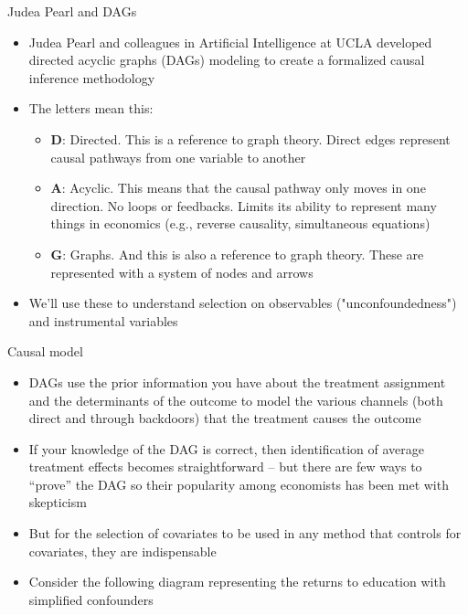 \documentclass{beamer}
\begin{document}
\begin{frame}{Judea Pearl and DAGs}


  \begin{itemize}
    \item Judea Pearl and colleagues in Artificial Intelligence at UCLA developed directed acyclic graphs (DAGs) modeling to create a formalized causal inference methodology
    \item The letters mean this:
    	\begin{itemize}
	\item \textbf{D}: Directed.  This is a reference to graph theory.  Direct edges represent causal pathways from one variable to another
	\item \textbf{A}: Acyclic.  This means that the causal pathway only moves in one direction.  No loops or feedbacks. Limits its ability to represent many things in economics (e.g., reverse causality, simultaneous equations)
	\item \textbf{G}: Graphs. And this is also a reference to graph theory.  These are represented with a system of nodes and arrows
	\end{itemize}
    \item We'll use these to understand selection on observables ("unconfoundedness") and instrumental variables
  \end{itemize}

\end{frame}






\begin{frame}{Causal model}

  \begin{itemize}
  \item DAGs use the prior information you have about the treatment assignment and the determinants of the outcome to model the various channels (both direct and through backdoors) that the treatment causes the outcome
	\item If your knowledge of the DAG is correct, then identification of average treatment effects becomes straightforward -- but there are few ways to ``prove'' the DAG so their popularity among economists has been met with skepticism
	\item But for the selection of covariates to be used in any method that controls for covariates, they are indispensable 
    \item Consider the following diagram representing the returns to education with simplified confounders
  \end{itemize}

\end{frame}
\end{document}
